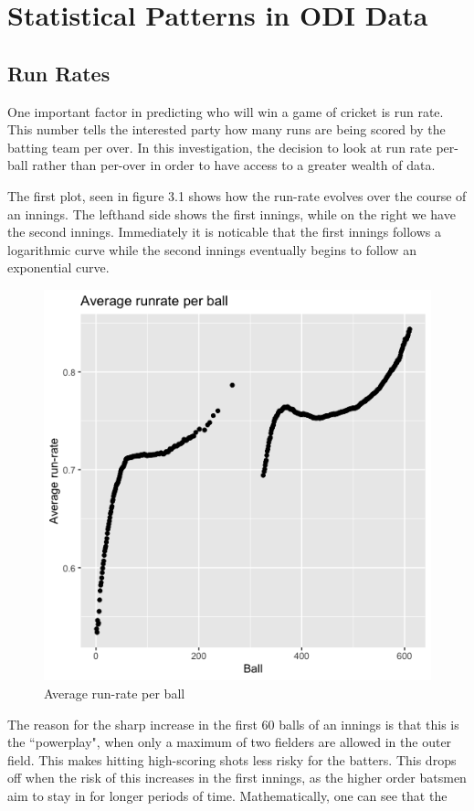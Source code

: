 \chapter{Statistical Patterns in ODI Data}

\section{Run Rates}
One important factor in predicting who will win a game of cricket is run rate. This number tells the interested party how many runs are being
scored by the batting team per over. In this investigation, the decision to look at run rate per-ball rather than per-over in order to have
access to a greater wealth of data. 

The first plot, seen in figure 3.1 shows how the run-rate evolves over the course of an innings. The lefthand side shows the first innings, while on the right we have the second innings.
Immediately it is noticable that the first innings follows a logarithmic curve while the second innings eventually begins to follow an exponential curve.

\begin{figure}[h]
    \centering
    \includegraphics[scale=0.5]{figures/avgrrperball.png}
    \caption{Average run-rate per ball}
\end{figure}

The reason for the sharp increase in the first 60 balls of an innings is that this is the ``powerplay", when only a maximum of two fielders are allowed
in the outer field. This makes hitting high-scoring shots less risky for the batters. This drops off when the risk of this increases in the first innings, as the 
higher order batsmen aim to stay in for longer periods of time. Mathematically, one can see that the 